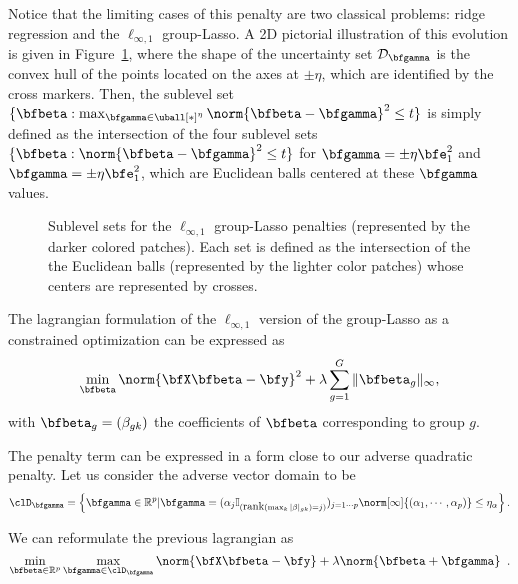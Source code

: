Notice that the limiting cases of this penalty are two classical problems: ridge
regression and the $\ell_{\infty,1}$ group-Lasso.
A 2D pictorial illustration of this evolution is given in
Figure~\ref{fig:group-penalty}, where the shape of the uncertainty set
$\mathcal{D}_{\bfgamma}$ is the convex hull of the points located on the axes at $\pm
\eta$, which are identified by the cross markers.
Then, the sublevel set 
$\{\bfbeta : \max_{\bfgamma \in \uball[*]^\eta} \norm{\bfbeta-\bfgamma}^2 \leq t\}$
is simply defined as the intersection of the four sublevel sets
$\{\bfbeta : \norm{\bfbeta - \bfgamma}^2 \leq t\}$ for 
$\bfgamma=\pm \eta\bfe^{2}_1$ and $\bfgamma=\pm \eta\bfe^{2}_1$,
which are Euclidean balls centered at these $\bfgamma$ values.
%
\begin{figure}
  \begin{center} 
    \caption{Sublevel sets for the $\ell_{\infty,1}$ group-Lasso penalties
             (represented by the darker colored patches).
             Each set is defined as the intersection of the the Euclidean balls
             (represented by the lighter color patches) whose centers are
             represented by crosses.}
    \label{fig:group-penalty}
    \end{center} 
\end{figure}

\iffalse
The  lagrangian formulation  of the  $\ell_{\infty,1}$ version  of the
group-Lasso as a constrained optimization can be expressed as
$$
 \min_{\bfbeta}     \norm{\bfX  \bfbeta  - \bfy  }^2+\lambda \sum_{g=1}^G \|\bfbeta_g\|_\infty,
$$
with $\bfbeta_g=(\beta_{gk})$ the coefficients of $\bfbeta$ corresponding to group $g$.


The penalty term can be expressed in a form close to our adverse quadratic penalty. Let us consider  the adverse vector domain to be
$$
 \clD_{\bfgamma}=\left\{ \bfgamma \in \mathbb{R}^p | \bfgamma= 
(\alpha_j \mathbb{I}_{(\mbox{rank}\left(  \max_k |\beta|_{gk}\right)=j) })_{j=1
      \cdots p } 
\norm[\infty]{(\alpha_1,\cdots,\alpha_p)} \leq \eta_\alpha \right\} .
$$

We can reformulate the previous lagrangian as 
\begin{equation}
    \min_{\bfbeta\in\mathbb{R}^p} \max_{\bfgamma \in \clD_{\bfgamma}}
    \norm{\bfX \bfbeta - \bfy } + \lambda \norm{\bfbeta +
    \bfgamma } \enspace.
\end{equation}


